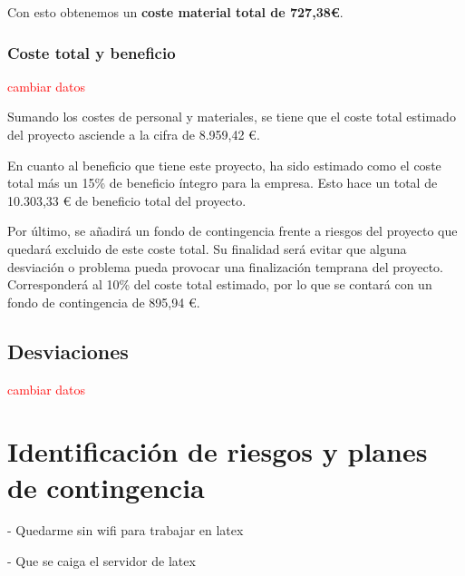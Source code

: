 Con esto obtenemos un \textbf{coste material total de 727,38€}.

\subsubsection{Coste total y beneficio}

\textcolor{red}{cambiar datos}

Sumando los costes de personal y materiales, se tiene que el coste total estimado del proyecto asciende a la cifra de 8.959,42 €.

En cuanto al beneficio que tiene este proyecto, ha sido estimado como el coste total más un 15\% de beneficio íntegro para la empresa. Esto hace un total de 10.303,33 € de beneficio total del proyecto.

Por último, se añadirá un fondo de contingencia frente a riesgos del proyecto que quedará excluido de este coste total. Su finalidad será evitar que alguna desviación o problema pueda provocar una finalización temprana del proyecto. Corresponderá al 10\% del coste total estimado, por lo que se contará con un fondo de contingencia de 895,94 €.

\subsection{Desviaciones}

\textcolor{red}{cambiar datos}


\section{Identificación de riesgos y planes de contingencia} \label{sec:03Riesgos}

- Quedarme sin wifi para trabajar en latex

- Que se caiga el servidor de latex